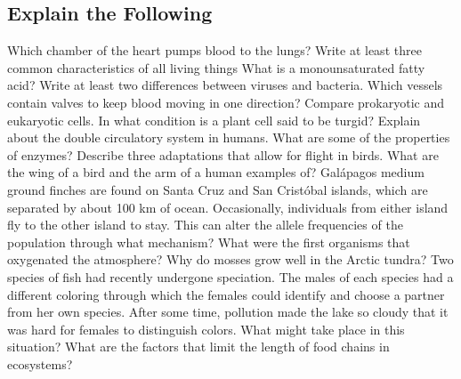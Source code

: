 \documentclass[12pt,addpoints]{exam}
\begin{document}
\begin{questions}
\begin{center}
		\subsection*{Explain the Following}
	\end{center}
		\question Which chamber of the heart pumps blood to the lungs? \vspace{0.5in}
		\question Write at least three common characteristics of all living things \vspace{1in}
		\question What is a monounsaturated fatty acid? \vspace{1in}
		\question Write at least two differences between viruses and bacteria. \vspace{1in}
		\question Which vessels contain valves to keep blood moving in one direction?\vspace{1in}
		\question Compare prokaryotic and eukaryotic cells. \vspace{1in}
		\question In what condition is a plant cell said to be turgid? \vspace{1in}
		\question Explain about the double circulatory system in humans. \vspace{1in}
		\question What are some of the properties of enzymes? \vspace{1in}
		\question Describe three adaptations that allow for flight in birds.\vspace{1in}
		\question What are the wing of a bird and the arm of a human examples of? \vspace{0.5in}
		\question Galápagos medium ground finches are found on Santa Cruz and San Cristóbal islands, which are separated by about 100 km of ocean. Occasionally, individuals from either island fly to the other island to stay. This can alter the allele frequencies of the population through what mechanism?\vspace{0.5in}
		\question What were the first organisms that oxygenated the atmosphere? \vspace{0.5in}
		\question Why do mosses grow well in the Arctic tundra?\vspace{0.5in}
		\question Two species of fish had recently undergone speciation. The males of each species had a different coloring through which the females could identify and choose a partner from her own species. After some time, pollution made the lake so cloudy that it was hard for females to distinguish colors. What might take place in this situation?\vspace{1in}
		\question What are the factors that limit the length of food chains in ecosystems?\vspace{1in}
		
	\end{questions}		
	
\end{document}
